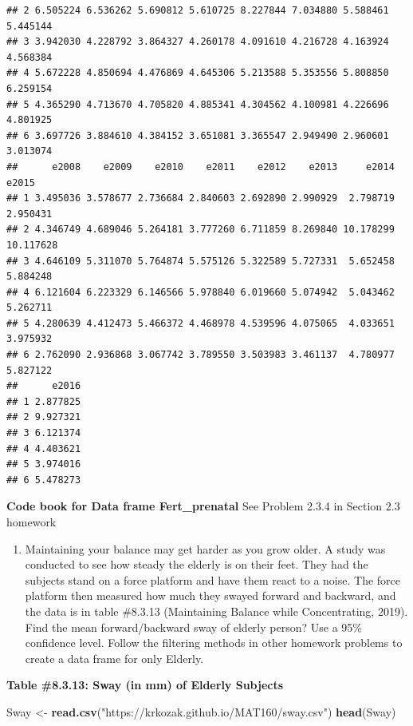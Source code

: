 \documentclass[
]{book}
\newenvironment{Shaded}{\begin{snugshade}}{\end{snugshade}}
\newcommand{\KeywordTok}[1]{\textcolor[rgb]{0.13,0.29,0.53}{\textbf{#1}}}
\newcommand{\NormalTok}[1]{#1}
\newcommand{\StringTok}[1]{\textcolor[rgb]{0.31,0.60,0.02}{#1}}
\providecommand{\tightlist}{%
  \setlength{\itemsep}{0pt}\setlength{\parskip}{0pt}}
\begin{document}
\begin{verbatim}
## 2 6.505224 6.536262 5.690812 5.610725 8.227844 7.034880 5.588461 5.445144
## 3 3.942030 4.228792 3.864327 4.260178 4.091610 4.216728 4.163924 4.568384
## 4 5.672228 4.850694 4.476869 4.645306 5.213588 5.353556 5.808850 6.259154
## 5 4.365290 4.713670 4.705820 4.885341 4.304562 4.100981 4.226696 4.801925
## 6 3.697726 3.884610 4.384152 3.651081 3.365547 2.949490 2.960601 3.013074
##      e2008    e2009    e2010    e2011    e2012    e2013     e2014     e2015
## 1 3.495036 3.578677 2.736684 2.840603 2.692890 2.990929  2.798719  2.950431
## 2 4.346749 4.689046 5.264181 3.777260 6.711859 8.269840 10.178299 10.117628
## 3 4.646109 5.311070 5.764874 5.575126 5.322589 5.727331  5.652458  5.884248
## 4 6.121604 6.223329 6.146566 5.978840 6.019660 5.074942  5.043462  5.262711
## 5 4.280639 4.412473 5.466372 4.468978 4.539596 4.075065  4.033651  3.975932
## 6 2.762090 2.936868 3.067742 3.789550 3.503983 3.461137  4.780977  5.827122
##      e2016
## 1 2.877825
## 2 9.927321
## 3 6.121374
## 4 4.403621
## 5 3.974016
## 6 5.478273
\end{verbatim}

\textbf{Code book for Data frame Fert\_prenatal} See Problem 2.3.4 in Section 2.3 homework

\begin{enumerate}
\def\labelenumi{\arabic{enumi}.}
\setcounter{enumi}{6}
\tightlist
\item
  Maintaining your balance may get harder as you grow older. A study was conducted to see how steady the elderly is on their feet. They had the subjects stand on a force platform and have them react to a noise. The force platform then measured how much they swayed forward and backward, and the data is in table \#8.3.13 (Maintaining Balance while Concentrating, 2019). Find the mean forward/backward sway of elderly person? Use a 95\% confidence level. Follow the filtering methods in other homework problems to create a data frame for only Elderly.
\end{enumerate}

\textbf{Table \#8.3.13: Sway (in mm) of Elderly Subjects}

\begin{Shaded}
\begin{Highlighting}[]
\NormalTok{Sway <-}\StringTok{ }\KeywordTok{read.csv}\NormalTok{(}\StringTok{"https://krkozak.github.io/MAT160/sway.csv"}\NormalTok{)}
\KeywordTok{head}\NormalTok{(Sway)}
\end{Highlighting}
\end{Shaded}
\end{document}
